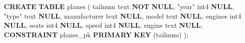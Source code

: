 \documentclass[
  10pt,
  titlepage=false]{exam}
\newenvironment{Shaded}{\begin{snugshade}}{\end{snugshade}}
\newcommand{\KeywordTok}[1]{\textcolor[rgb]{0.00,0.23,0.31}{\textbf{#1}}}
\newcommand{\NormalTok}[1]{\textcolor[rgb]{0.00,0.23,0.31}{#1}}
\newcommand{\OtherTok}[1]{\textcolor[rgb]{0.00,0.23,0.31}{#1}}
\begin{document}
\begin{Shaded}
\begin{Highlighting}[]
\KeywordTok{CREATE} \KeywordTok{TABLE}\NormalTok{ planes (}
\NormalTok{    tailnum text }\KeywordTok{NOT} \KeywordTok{NULL}\NormalTok{,}
    \OtherTok{"year"}\NormalTok{ int4 }\KeywordTok{NULL}\NormalTok{,}
    \OtherTok{"type"}\NormalTok{ text }\KeywordTok{NULL}\NormalTok{,}
\NormalTok{    manufacturer text }\KeywordTok{NULL}\NormalTok{,}
\NormalTok{    model text }\KeywordTok{NULL}\NormalTok{,}
\NormalTok{    engines int4 }\KeywordTok{NULL}\NormalTok{,}
\NormalTok{    seats int4 }\KeywordTok{NULL}\NormalTok{,}
\NormalTok{    speed int4 }\KeywordTok{NULL}\NormalTok{,}
\NormalTok{    engine text }\KeywordTok{NULL}\NormalTok{,}
    \KeywordTok{CONSTRAINT}\NormalTok{ planes\_pk   }\KeywordTok{PRIMARY} \KeywordTok{KEY}\NormalTok{ (tailnum)}
\NormalTok{);}
\end{Highlighting}
\end{Shaded}
\end{document}
